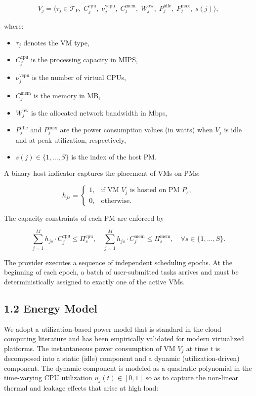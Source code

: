 \documentclass[11pt,a4paper]{article}
\begin{document}
$$
V_j = \big\langle \tau_j \in \mathcal{T}_V,\; C^{\text{cpu}}_j,\; \nu^{\text{vcpu}}_j,\; C^{\text{mem}}_j,\; W^{\text{bw}}_j,\; P^{\text{idle}}_j,\; P^{\text{max}}_j,\; s(j) \big\rangle,
$$

where:
\begin{itemize}[leftmargin=2em,itemsep=2pt]
  \item $\tau_j$ denotes the VM type,
  \item $C^{\text{cpu}}_j$ is the processing capacity in MIPS,
  \item $\nu^{\text{vcpu}}_j$ is the number of virtual CPUs,
  \item $C^{\text{mem}}_j$ is the memory in MB,
  \item $W^{\text{bw}}_j$ is the allocated network bandwidth in Mbps,
  \item $P^{\text{idle}}_j$ and $P^{\text{max}}_j$ are the power consumption values (in watts) when $V_j$ is idle and at peak utilization, respectively,
  \item $s(j) \in \{1,\ldots,S\}$ is the index of the host PM.
\end{itemize}

A binary host indicator captures the placement of VMs on PMs:

$$
h_{js} =
\begin{cases}
1, & \text{if VM } V_j \text{ is hosted on PM } P_s, \\
0, & \text{otherwise.}
\end{cases}
$$

The capacity constraints of each PM are enforced by

$$
\sum_{j=1}^{M} h_{js} \cdot C^{\text{cpu}}_j \leq \Pi^{\text{cpu}}_s, \quad
\sum_{j=1}^{M} h_{js} \cdot C^{\text{mem}}_j \leq \Pi^{\text{mem}}_s, \quad \forall s \in \{1,\ldots,S\}.
$$

The provider executes a sequence of independent scheduling epochs. At the beginning of each epoch, a batch of user-submitted tasks arrives and must be deterministically assigned to exactly one of the active VMs.

\subsection*{1.2 Energy Model}

We adopt a utilization-based power model that is standard in the cloud computing literature and has been empirically validated for modern virtualized platforms. The instantaneous power consumption of VM $V_j$ at time $t$ is decomposed into a static (idle) component and a dynamic (utilization-driven) component. The dynamic component is modeled as a quadratic polynomial in the time-varying CPU utilization $u_j(t) \in [0,1]$ so as to capture the non-linear thermal and leakage effects that arise at high load:
\end{document}
